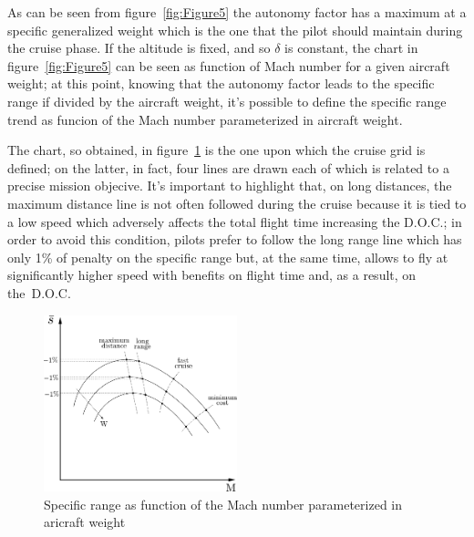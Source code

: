%
\noindent
As can be seen from figure~\ref{fig:Figure5} the autonomy factor has a maximum at a specific generalized weight which is the one that the pilot should maintain during the cruise phase. 
%
If the altitude is fixed, and so $\delta$ is constant, the chart in figure~\ref{fig:Figure5} can be seen as function of Mach number for a given aircraft weight; at this point, knowing that the autonomy factor leads to the specific range if divided by the aircraft weight, it's possible to define the specific range trend as funcion of the Mach number parameterized in aircraft weight. 

\bigskip
\noindent
The chart, so obtained, in figure~\ref{fig:Figure6} is the one upon which the cruise grid is defined; on the latter, in fact, four lines are drawn each of which is related to a precise mission objecive.
%
It's important to highlight that, on long distances, the maximum distance line is not often followed during the cruise because it is tied to a low speed which adversely affects the total flight time increasing the D.O.C.; in order to avoid this condition, pilots prefer to follow the long range line which has only 1\% of penalty on the specific range but, at the same time, allows to fly at significantly higher speed with benefits on flight time and, as a result, on the~D.O.C.
%
\begin{figure}[H]
\centering
\includegraphics[keepaspectratio, width=0.50\textwidth]{CruiseGrid}
\caption{Specific range as function of the Mach number parameterized in aricraft weight}
\label{fig:Figure6}
\end{figure}
%
